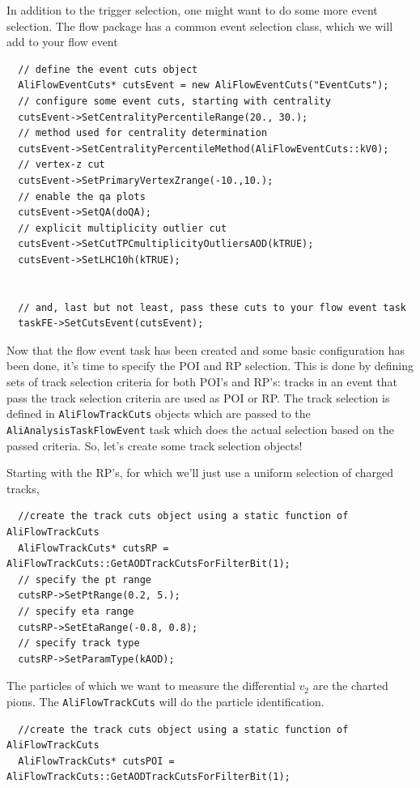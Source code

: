 \documentclass[a4paper]{book}
\numberwithin{equation}{subsection}
\begin{document}
\begin{description}
In addition to the trigger selection, one might want to do some more event selection. The flow package has a common event selection class, which we will add to your flow event

\begin{lstlisting}
  // define the event cuts object
  AliFlowEventCuts* cutsEvent = new AliFlowEventCuts("EventCuts");
  // configure some event cuts, starting with centrality
  cutsEvent->SetCentralityPercentileRange(20., 30.);
  // method used for centrality determination
  cutsEvent->SetCentralityPercentileMethod(AliFlowEventCuts::kV0);
  // vertex-z cut
  cutsEvent->SetPrimaryVertexZrange(-10.,10.);
  // enable the qa plots
  cutsEvent->SetQA(doQA);
  // explicit multiplicity outlier cut
  cutsEvent->SetCutTPCmultiplicityOutliersAOD(kTRUE);
  cutsEvent->SetLHC10h(kTRUE);
  
  
  // and, last but not least, pass these cuts to your flow event task
  taskFE->SetCutsEvent(cutsEvent);\end{lstlisting}

Now that the flow event task has been created and some basic configuration has been done, it's time to specify the POI and RP selection. This is done by defining sets of track selection criteria for both POI's and RP's: tracks in an event that pass the track selection criteria are used as POI or RP. The track selection is defined in \texttt{AliFlowTrackCuts} objects which are passed to the \texttt{AliAnalysisTaskFlowEvent} task which does the actual selection based on the passed criteria. So, let's create some track selection objects!

Starting with the RP's, for which we'll just use a uniform selection of charged tracks,
\begin{lstlisting}
  //create the track cuts object using a static function of AliFlowTrackCuts
  AliFlowTrackCuts* cutsRP = AliFlowTrackCuts::GetAODTrackCutsForFilterBit(1);
  // specify the pt range
  cutsRP->SetPtRange(0.2, 5.);
  // specify eta range
  cutsRP->SetEtaRange(-0.8, 0.8);
  // specify track type
  cutsRP->SetParamType(kAOD);\end{lstlisting}
  
The particles of which we want to measure the differential $v_2$ are the charted pions. The \texttt{AliFlowTrackCuts} will do the particle identification. 
  
\begin{lstlisting}
  //create the track cuts object using a static function of AliFlowTrackCuts
  AliFlowTrackCuts* cutsPOI = AliFlowTrackCuts::GetAODTrackCutsForFilterBit(1);
  

\end{lstlisting}
\end{description}
\end{document}
